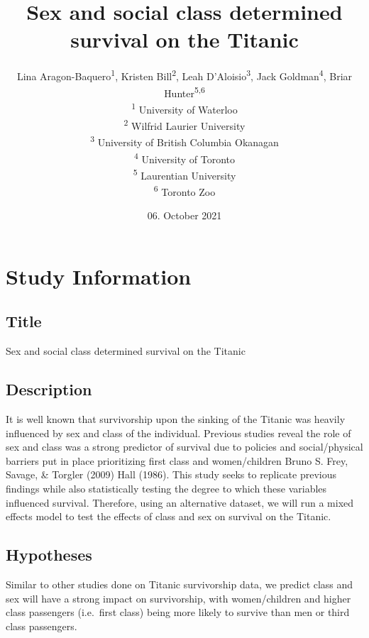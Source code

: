\documentclass[]{article}
\title{Sex and social class determined survival on the Titanic}
\author{
          Lina Aragon-Baquero\textsuperscript{1},
          Kristen Bill\textsuperscript{2},
          Leah D'Aloisio\textsuperscript{3},
          Jack Goldman\textsuperscript{4},
          Briar Hunter\textsuperscript{5,6}          \\ \vspace{0.5cm}
              \textsuperscript{1} University of Waterloo\\
              \textsuperscript{2} Wilfrid Laurier University\\
              \textsuperscript{3} University of British Columbia
Okanagan\\
              \textsuperscript{4} University of Toronto\\
              \textsuperscript{5} Laurentian University\\
              \textsuperscript{6} Toronto Zoo      }
\date{06. October 2021}
\newcounter{question}
\begin{document}
\maketitle
\vspace{2pc}


\newcommand\Question[2]{%
   \leavevmode\par
   \stepcounter{question}
   \noindent
   \textbf{\thequestion. #1}. #2\par}

\newcommand\Answer[1]{%
    \noindent
    \textit{Registered response}: #1\par}
    
\hypertarget{study-information}{%
\section{Study Information}\label{study-information}}

\hypertarget{title}{%
\subsection{Title}\label{title}}

Sex and social class determined survival on the Titanic

\hypertarget{description}{%
\subsection{Description}\label{description}}

It is well known that survivorship upon the sinking of the Titanic was
heavily influenced by sex and class of the individual. Previous studies
reveal the role of sex and class was a strong predictor of survival due
to policies and social/physical barriers put in place prioritizing first
class and women/children Bruno S. Frey, Savage, \& Torgler (2009) Hall
(1986). This study seeks to replicate previous findings while also
statistically testing the degree to which these variables influenced
survival. Therefore, using an alternative dataset, we will run a mixed
effects model to test the effects of class and sex on survival on the
Titanic.

\hypertarget{hypotheses}{%
\subsection{Hypotheses}\label{hypotheses}}

Similar to other studies done on Titanic survivorship data, we predict
class and sex will have a strong impact on survivorship, with
women/children and higher class passengers (i.e.~first class) being more
likely to survive than men or third class passengers.
\end{document}
